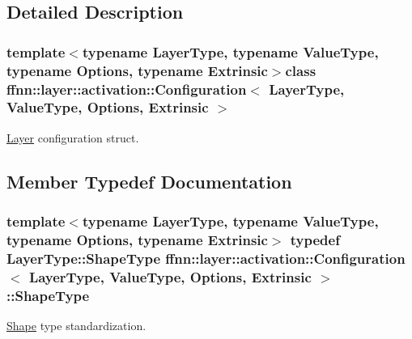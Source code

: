 \subsection{Detailed Description}
\subsubsection*{template$<$typename Layer\-Type, typename Value\-Type, typename Options, typename Extrinsic$>$class ffnn\-::layer\-::activation\-::\-Configuration$<$ Layer\-Type, Value\-Type, Options, Extrinsic $>$}

\hyperlink{classffnn_1_1layer_1_1_layer}{Layer} configuration struct. 

\subsection{Member Typedef Documentation}
\hypertarget{classffnn_1_1layer_1_1activation_1_1_configuration_a832eb6a16c052e532341dcf1a5a03f0d}{
\subsubsection[{Shape\-Type}]{\setlength{\rightskip}{0pt plus 5cm}template$<$typename Layer\-Type, typename Value\-Type, typename Options, typename Extrinsic$>$ typedef Layer\-Type\-::\-Shape\-Type {\bf ffnn\-::layer\-::activation\-::\-Configuration}$<$ {\bf Layer\-Type}, Value\-Type, Options, Extrinsic $>$\-::{\bf Shape\-Type}}}\label{classffnn_1_1layer_1_1activation_1_1_configuration_a832eb6a16c052e532341dcf1a5a03f0d}


\hyperlink{structffnn_1_1layer_1_1_shape}{Shape} type standardization. 




